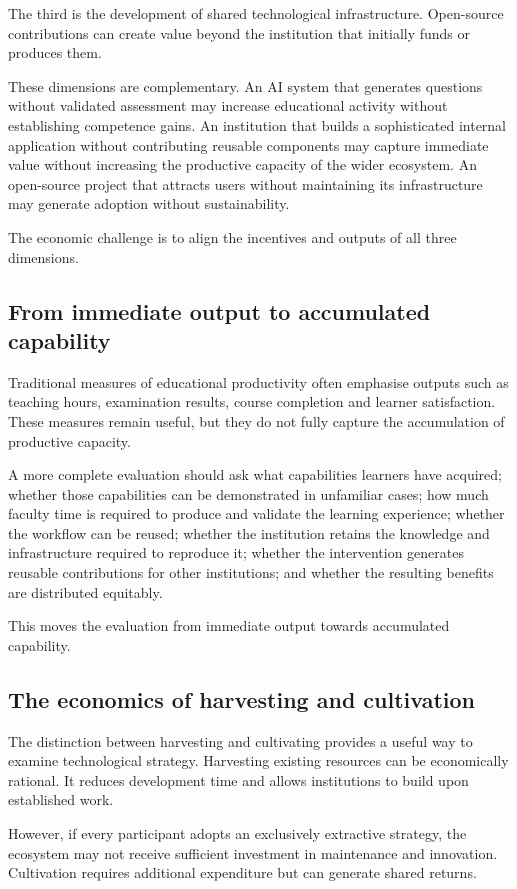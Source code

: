 \documentclass[11pt,a4paper]{article}
\begin{document}
The third is the development of shared technological infrastructure. Open-source contributions can create value beyond the institution that initially funds or produces them.

These dimensions are complementary. An AI system that generates questions without validated assessment may increase educational activity without establishing competence gains. An institution that builds a sophisticated internal application without contributing reusable components may capture immediate value without increasing the productive capacity of the wider ecosystem. An open-source project that attracts users without maintaining its infrastructure may generate adoption without sustainability.

The economic challenge is to align the incentives and outputs of all three dimensions.

\subsection{From immediate output to accumulated capability}
Traditional measures of educational productivity often emphasise outputs such as teaching hours, examination results, course completion and learner satisfaction. These measures remain useful, but they do not fully capture the accumulation of productive capacity.

A more complete evaluation should ask what capabilities learners have acquired; whether those capabilities can be demonstrated in unfamiliar cases; how much faculty time is required to produce and validate the learning experience; whether the workflow can be reused; whether the institution retains the knowledge and infrastructure required to reproduce it; whether the intervention generates reusable contributions for other institutions; and whether the resulting benefits are distributed equitably.

This moves the evaluation from immediate output towards accumulated capability.

\subsection{The economics of harvesting and cultivation}
The distinction between harvesting and cultivating provides a useful way to examine technological strategy. Harvesting existing resources can be economically rational. It reduces development time and allows institutions to build upon established work.

However, if every participant adopts an exclusively extractive strategy, the ecosystem may not receive sufficient investment in maintenance and innovation. Cultivation requires additional expenditure but can generate shared returns.
\end{document}
